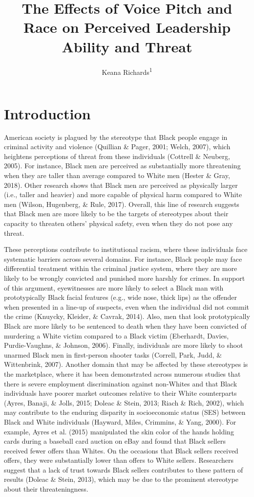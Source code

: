\documentclass[
  english,
  man]{apa6}
\title{The Effects of Voice Pitch and Race on Perceived Leadership Ability and Threat}
\author{Keana Richards\textsuperscript{1}}
\date{}
\affiliation{\vspace{0.5cm}\textsuperscript{1} University of Pennsylvania}
\begin{document}
\maketitle

\hypertarget{introduction}{%
\section{Introduction}\label{introduction}}

American society is plagued by the stereotype that Black people engage in criminal activity and violence (Quillian \& Pager, 2001; Welch, 2007), which heightens perceptions of threat from these individuals (Cottrell \& Neuberg, 2005). For instance, Black men are perceived as substantially more threatening when they are taller than average compared to White men (Hester \& Gray, 2018). Other research shows that Black men are perceived as physically larger (i.e., taller and heavier) and more capable of physical harm compared to White men (Wilson, Hugenberg, \& Rule, 2017). Overall, this line of research suggests that Black men are more likely to be the targets of stereotypes about their capacity to threaten others' physical safety, even when they do not pose any threat.

These perceptions contribute to institutional racism, where these individuals face systematic barriers across several domains. For instance, Black people may face differential treatment within the criminal justice system, where they are more likely to be wrongly convicted and punished more harshly for crimes. In support of this argument, eyewitnesses are more likely to select a Black man with prototypically Black facial features (e.g., wide nose, thick lips) as the offender when presented in a line-up of suspects, even when the individual did not commit the crime (Knuycky, Kleider, \& Cavrak, 2014). Also, men that look prototypically Black are more likely to be sentenced to death when they have been convicted of murdering a White victim compared to a Black victim (Eberhardt, Davies, Purdie-Vaughns, \& Johnson, 2006). Finally, individuals are more likely to shoot unarmed Black men in first-person shooter tasks (Correll, Park, Judd, \& Wittenbrink, 2007). Another domain that may be affected by these stereotypes is the marketplace, where it has been demonstrated across numerous studies that there is severe employment discrimination against non-Whites and that Black individuals have poorer market outcomes relative to their White counterparts (Ayres, Banaji, \& Jolls, 2015; Doleac \& Stein, 2013; Riach \& Rich, 2002), which may contribute to the enduring disparity in socioeconomic status (SES) between Black and White individuals (Hayward, Miles, Crimmins, \& Yang, 2000). For example, Ayres et al. (2015) manipulated the skin color of the hands holding cards during a baseball card auction on eBay and found that Black sellers received fewer offers than Whites. On the occasions that Black sellers received offers, they were substantially lower than offers to White sellers. Researchers suggest that a lack of trust towards Black sellers contributes to these pattern of results (Doleac \& Stein, 2013), which may be due to the prominent stereotype about their threateningness.
\end{document}
